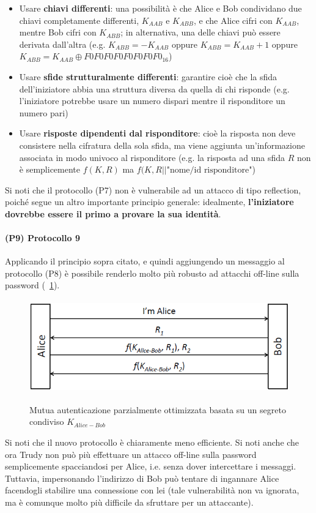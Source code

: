 \begin{itemize}
	\item Usare \textbf{chiavi differenti}: una possibilità è che Alice e Bob condividano due chiavi completamente differenti, $K_{AAB}$ e $K_{ABB}$, e che Alice cifri con $K_{AAB}$, mentre Bob cifri con $K_{ABB}$; in alternativa, una delle chiavi può essere derivata dall'altra (e.g. $K_{ABB} = -K_{AAB}$ oppure $K_{ABB} = K_{AAB} + 1$ oppure $K_{ABB} = K_{AAB} \oplus F0F0F0F0F0F0F0F0_{16}$)
	\item Usare \textbf{sfide strutturalmente differenti}: garantire cioè che la sfida dell'iniziatore abbia una struttura diversa da quella di chi risponde (e.g. l'iniziatore potrebbe usare un numero dispari mentre il risponditore un numero pari)
	\item Usare \textbf{risposte dipendenti dal risponditore}: cioè la risposta non deve consistere nella cifratura della sola sfida, ma viene aggiunta un'informazione associata in modo univoco al risponditore (e.g. la risposta ad una sfida $R$ non è semplicemente $f(K, R)$ ma $f(K, R||\text{"nome/id risponditore"}$)
\end{itemize}
Si noti che il protocollo (P7) non è vulnerabile ad un attacco di tipo reflection, poiché segue un altro importante principio generale: idealmente, \textbf{l'iniziatore dovrebbe essere il primo a provare la sua identità}.
\paragraph{(P9) Protocollo 9}
Applicando il principio sopra citato, e quindi aggiungendo un messaggio al protocollo (P8) è possibile renderlo molto più robusto ad attacchi off-line sulla password (\figurename~\ref{fig:ImgS45bis}).
\begin{figure}[htbp]
	\centering%
	\subfigure%
	{\includegraphics[height=4cm, width=12cm, keepaspectratio]{Immagini/autenticazione/ImgS45bis.png}}
	\caption{Mutua autenticazione parzialmente ottimizzata basata su un segreto condiviso $K_{Alice-Bob}$}\label{fig:ImgS45bis} 	
\end{figure}
Si noti che il nuovo protocollo è chiaramente meno efficiente. Si noti anche che ora Trudy non può più effettuare un attacco off-line sulla password semplicemente spacciandosi per Alice, i.e. senza dover intercettare i messaggi. Tuttavia, impersonando l'indirizzo di Bob può tentare di ingannare Alice facendogli stabilire una connessione con lei (tale vulnerabilità non va ignorata, ma è comunque molto più difficile da sfruttare per un attaccante).
